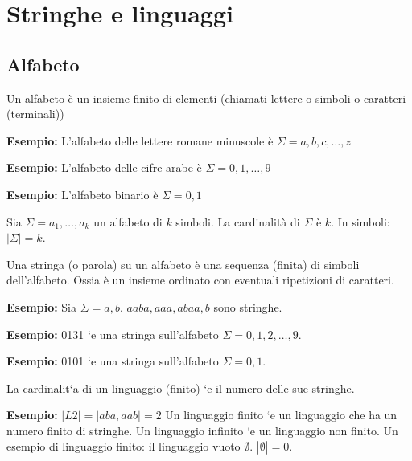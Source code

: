 \chapter{Stringhe e linguaggi}

\section{Alfabeto}
Un alfabeto è un insieme finito di elementi (chiamati lettere
o simboli o caratteri (terminali))

\vspace{5mm}

\textbf{Esempio:} L’alfabeto delle lettere romane minuscole è
\(\Sigma = {a, b, c, \dots, z}\) 

\vspace{5mm}

\textbf{Esempio:} L’alfabeto delle cifre arabe è
\(\Sigma = {0, 1, \dots , 9}\) 

\vspace{5mm}

\textbf{Esempio:} L’alfabeto binario è
\(\Sigma = {0, 1}\) 

\vspace{5mm}

Sia \(\Sigma = {a_1, \dots, a_k}\) un alfabeto di \(k\) simboli. La cardinalità di \(\Sigma\) è \(k\). In simboli: \(|\Sigma| = k\).

Una stringa (o parola) su un alfabeto è una sequenza (finita)
di simboli dell’alfabeto.
Ossia è un insieme ordinato con eventuali ripetizioni di
caratteri.

\vspace{5mm}

\textbf{Esempio:} Sia \(\Sigma = {a, b}\).
\(aaba, aaa, abaa, b\) sono stringhe.
\vspace{5mm}

\textbf{Esempio:} 0131 `e una stringa sull’alfabeto \(\Sigma = {0, 1, 2, \dots, 9}\).
\vspace{5mm}

\textbf{Esempio:} 0101 `e una stringa sull’alfabeto \(\Sigma = {0, 1}\).

La cardinalit`a di un linguaggio (finito) `e il numero delle sue
stringhe.
\vspace{5mm}

\textbf{Esempio:}
\(|L2| = |{aba, aab}| = 2\)
Un linguaggio finito `e un linguaggio che ha un numero finito
di stringhe.
Un linguaggio infinito `e un linguaggio non finito.
Un esempio di linguaggio finito: il linguaggio vuoto \(\emptyset\).
\(|\emptyset| = 0\).

